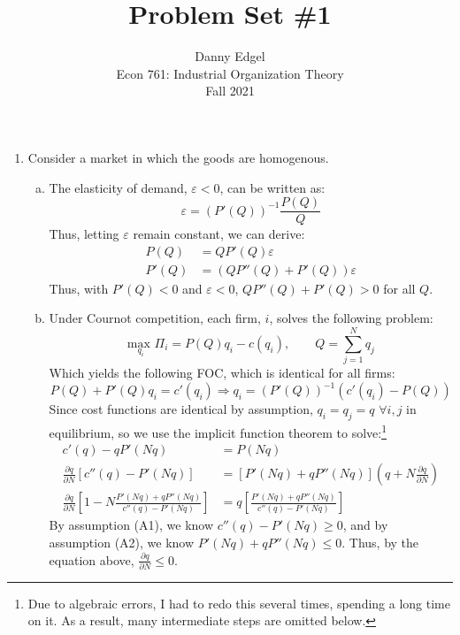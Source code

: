 \documentclass{article}
\newcommand{\usmax}[1]{\underset{#1}{\text{max }}}
\newcommand{\pl}{\partial}
\begin{document}
\title{	Problem Set \#1 }
\author{ 		Danny Edgel 						\\ 
			Econ 761: Industrial Organization Theory	\\
			Fall 2021						\\
		}
\maketitle\thispagestyle{empty}



\begin{enumerate}
	\item Consider a market in which the goods are homogenous.
  \begin{enumerate}[(a)]
    \item The elasticity of demand, $\varepsilon<0$, can be written as: 
              \[ \varepsilon = \left(P'(Q)\right)^{-1}\frac{P(Q)}{Q} \]
      Thus, letting $\varepsilon$ remain constant, we can derive:
      \begin{align*}
        P(Q)	&= QP'(Q)\varepsilon				\\
        P'(Q)	&= \left(QP''(Q) + P'(Q)\right)\varepsilon
      \end{align*}
      Thus, with $P'(Q)<0$ and $\varepsilon<0$, ${QP''(Q) + P'(Q)>0}$ for all $Q$.

    \item Under Cournot competition, each firm, $i$, solves the following problem:
    \[
      \usmax{q_i}\Pi_i = P(Q)q_i - c(q_i),\quad\quad Q = \sum_{j=1}^N q_j
    \]
    Which yields the following FOC, which is identical for all firms:
    \[
      P(Q) + P'(Q)q_i = c'(q_i)\Rightarrow q_i = \left(P'(Q)\right)^{-1}\left(c'(q_i) - P(Q)\right)
    \]
    Since cost functions are identical by assumption, $q_i=q_j=q$ $\forall i,j$ in equilibrium, so we use the implicit function theorem to solve:\footnote{Due to algebraic errors, I had to redo this several times, spending a long time on it. As a result, many intermediate steps are omitted below.}
    \begin{align*}
        c'(q) - qP'(Nq) &= P(Nq)    \\
        \frac{\pl q}{\pl N}\left[c''(q)-P'(Nq)\right] &= \left[P'(Nq) + qP''(Nq)\right]\left(q + N\frac{\pl q}{\pl N}\right)   \\
        \frac{\pl q}{\pl N}\left[1-N\frac{P'(Nq) + qP''(Nq)}{c''(q)-P'(Nq)}\right] &= q\left[\frac{P'(Nq) + qP''(Nq)}{c''(q)-P'(Nq)}\right]
    \end{align*}
    By assumption (A1), we know $c''(q)-P'(Nq)\geq 0$, and by assumption (A2), we know ${P'(Nq)+qP''(Nq)\leq 0}$. Thus, by the equation above, $\frac{\pl q}{\pl N}\leq 0$. \medskip \\
  \end{enumerate}


\end{enumerate}
\end{document}

